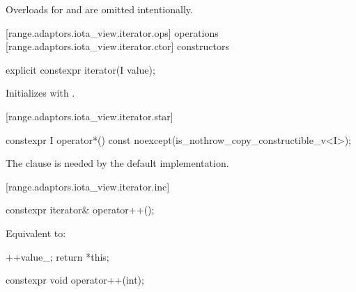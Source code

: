 {\pnum
\begin{note}
Overloads for  and  are omitted
intentionally.
\end{note}

[range.adaptors.iota_view.iterator.ops]{ operations}
[range.adaptors.iota_view.iterator.ctor]{ constructors}

\begin{itemdecl}
explicit constexpr iterator(I value);
\end{itemdecl}

\begin{itemdescr}
\pnum
\effects Initializes  with .
\end{itemdescr}

[range.adaptors.iota_view.iterator.star]{}

\begin{itemdecl}
constexpr I operator*() const noexcept(is_nothrow_copy_constructible_v<I>);
\end{itemdecl}

\begin{itemdescr}
\pnum
\oldtxt{\returns} 

\pnum
\begin{note}
The  clause is needed by the default 
implementation.
\end{note}
\end{itemdescr}

[range.adaptors.iota_view.iterator.inc]{}

\begin{itemdecl}
constexpr iterator& operator++();
\end{itemdecl}

\begin{itemdescr}
\pnum
\effects Equivalent to:
\begin{codeblock}
++value_;
return *this;
\end{codeblock}
\end{itemdescr}

\begin{itemdecl}
constexpr void operator++(int);
\end{itemdecl}

}
